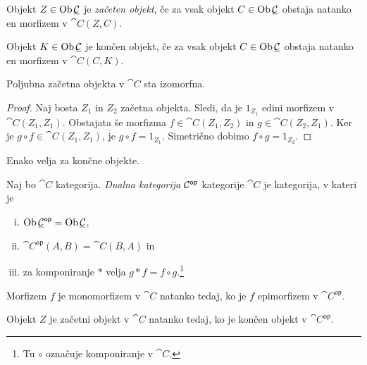\begin{definicija}
Objekt $Z \in \operatorname{Ob} \underline{\mathcal{C}}$ je
\emph{začeten objekt}, če
za vsak objekt $C \in \operatorname{Ob} \underline{\mathcal{C}}$ obstaja natanko en morfizem v
$\cat{C}(Z,C)$.

Objekt $K \in \operatorname{Ob} \underline{\mathcal{C}}$ je končen objekt, če za vsak objekt
$C \in \operatorname{Ob} \underline{\mathcal{C}}$ obstaja natanko en morfizem v $\cat{C}(C,K)$.
\end{definicija}

\begin{trditev}
Poljubna začetna objekta v $\cat{C}$ sta izomorfna.
\end{trditev}

\begin{proof}
Naj bosta $Z_1$ in $Z_2$ začetna objekta. Sledi, da je $1_{Z_1}$
edini morfizem v $\cat{C}(Z_1, Z_1)$. Obstajata še morfizma
$f \in \cat{C}(Z_1, Z_2)$ in $g \in \cat{C}(Z_2, Z_1)$. Ker je
$g \circ f \in \cat{C}(Z_1, Z_1)$, je $g \circ f = 1_{Z_1}$.
Simetrično dobimo $f \circ g = 1_{Z_2}$.
\end{proof}

\begin{opomba}
Enako velja za končne objekte.
\end{opomba}

\begin{definicija}
Naj bo $\cat{C}$ kategorija.
\emph{Dualna kategorija}
$\cal{C}^{\mathsf{op}}$ kategorije $\cat{C}$ je kategorija, v
kateri je

\begin{enumerate}[i)]
\item $\operatorname{Ob} \underline{\mathcal{C}}^{\mathsf{op}} = \operatorname{Ob} \underline{\mathcal{C}}$,
\item $	\cat{C}^{\mathsf{op}}(A,B) = \cat{C}(B,A)$ in
\item za komponiranje $*$ velja $g * f = f \circ g$.\footnote{Tu
$\circ$ označuje komponiranje v $\cat{C}$.}
\end{enumerate}
\end{definicija}

\begin{opomba}
Morfizem $f$ je monomorfizem v $\cat{C}$ natanko tedaj, ko je
$f$ epimorfizem v $\cat{C}^{\mathsf{op}}$.
\end{opomba}

\begin{opomba}
Objekt $Z$ je začetni objekt v $\cat{C}$ natanko tedaj, ko je
končen objekt v $\cat{C}^{\mathsf{op}}$.
\end{opomba}

